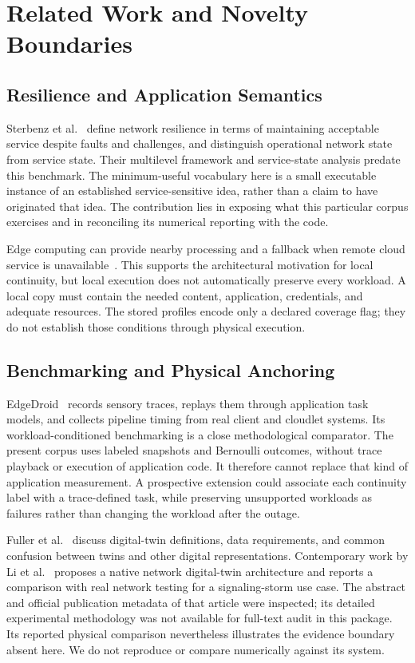 \section{Related Work and Novelty Boundaries}
\label{sec:related}
\subsection{Resilience and Application Semantics}
Sterbenz et al.~\cite{sterbenz2010} define network resilience in terms of maintaining acceptable service despite faults and challenges, and distinguish operational network state from service state. Their multilevel framework and service-state analysis predate this benchmark. The minimum-useful vocabulary here is a small executable instance of an established service-sensitive idea, rather than a claim to have originated that idea. The contribution lies in exposing what this particular corpus exercises and in reconciling its numerical reporting with the code.

Edge computing can provide nearby processing and a fallback when remote cloud service is unavailable~\cite{satyanarayanan2017}. This supports the architectural motivation for local continuity, but local execution does not automatically preserve every workload. A local copy must contain the needed content, application, credentials, and adequate resources. The stored profiles encode only a declared coverage flag; they do not establish those conditions through physical execution.

\subsection{Benchmarking and Physical Anchoring}
EdgeDroid~\cite{olguin2019} records sensory traces, replays them through application task models, and collects pipeline timing from real client and cloudlet systems. Its workload-conditioned benchmarking is a close methodological comparator. The present corpus uses labeled snapshots and Bernoulli outcomes, without trace playback or execution of application code. It therefore cannot replace that kind of application measurement. A prospective extension could associate each continuity label with a trace-defined task, while preserving unsupported workloads as failures rather than changing the workload after the outage.

Fuller et al.~\cite{fuller2020} discuss digital-twin definitions, data requirements, and common confusion between twins and other digital representations. Contemporary work by Li et al.~\cite{li2025} proposes a native network digital-twin architecture and reports a comparison with real network testing for a signaling-storm use case. The abstract and official publication metadata of that article were inspected; its detailed experimental methodology was not available for full-text audit in this package. Its reported physical comparison nevertheless illustrates the evidence boundary absent here. We do not reproduce or compare numerically against its system.

